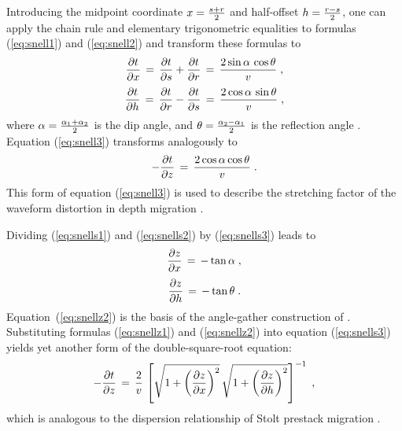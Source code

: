 Introducing the midpoint coordinate $x = {{s+ r} \over 2}$ and half-offset
$h = {{r - s} \over 2}$, one can apply the chain rule and elementary
trigonometric equalities to formulas (\ref{eq:snell1}) and
(\ref{eq:snell2}) and transform these formulas to 
\begin{equation}
{{\partial t} \over {\partial x}} \,=\, 
{{\partial t} \over {\partial s}} + 
{{\partial t} \over {\partial r}} \,=\, 
{ {2 \sin{\alpha}\,\cos{\theta}} \over {v}}\;,
\label{eq:snells1}
\end{equation}
\begin{equation}
{{\partial t} \over {\partial h}} \,=\,
{{\partial t} \over {\partial r}} - 
{{\partial t} \over {\partial s}} \,=\, 
{ {2 \cos{\alpha}\,\sin{\theta}} \over {v}} \;,
\label{eq:snells2}
\end{equation}
where $\alpha = {{\alpha_1 + \alpha_2} \over 2}$ is the dip angle, and
$\theta = {{\alpha_2 - \alpha_1} \over 2}$ is the reflection angle
\cite[]{Clayton.sep.14.21,Claerbout.blackwell.85}. Equation
(\ref{eq:snell3}) transforms analogously to
\begin{equation}
- {{\partial t} \over {\partial z}} \,=\,
{{2 \cos{\alpha} \cos{\theta}} \over {v}}\;. 
\label{eq:snells3}
\end{equation}
This form of equation (\ref{eq:snell3}) is used to describe the stretching
factor of the waveform distortion in depth migration \cite[]{Tygel}.

Dividing (\ref{eq:snells1}) and (\ref{eq:snells2}) by
(\ref{eq:snells3}) leads to
\begin{equation}
{{\partial z} \over {\partial x}} \,=\,
- \tan{\alpha}\;, 
\label{eq:snellz1}
\end{equation}
\begin{equation}
{{\partial z} \over {\partial h}} \,=\,
- \tan{\theta}\;.
\label{eq:snellz2}
\end{equation}
Equation~(\ref{eq:snellz2}) is the basis of the angle-gather construction of
\cite{sandf}.
Substituting formulas (\ref{eq:snellz1}) and (\ref{eq:snellz2}) into equation
(\ref{eq:snells3}) yields yet another form of the double-square-root equation:
\begin{equation}
- {{\partial t} \over {\partial z}} \,=\, {2 \over {v}}\,
\left[\sqrt{1 + \left({\partial z} \over {\partial x}\right)^2}\,
\sqrt{1 + \left({\partial z} \over {\partial h}\right)^2}\right]^{-1}\;, 
\label{eq:snellz3}
\end{equation}
which is analogous to the dispersion relationship of Stolt prestack
migration \cite[]{GEO43.01.00230048}.
 
